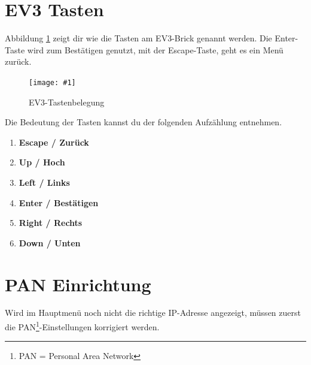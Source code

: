 \documentclass[
	12pt,
	colorbacktitle,
	accentcolor=tud1c,
	german,
	article
]{tuddesign/tudreport}
\newcommand{\gcenter}[4]{
	\begin{figure}[h]
	\centering 
	\texttt{[image: \#1]}
	\caption{#2}
	\label{fig:#3}
	\end{figure}
}
\begin{document}
		\newpage
		\section{EV3 Tasten}
		Abbildung \ref{fig:buttons} zeigt dir wie die Tasten am EV3-Brick genannt werden. Die Enter-Taste wird zum Bestätigen genutzt, mit der Escape-Taste, geht es ein Menü zurück. 
		\gcenter{img/ev3_buttons.png}{EV3-Tastenbelegung\protect\footnotemark\ }{buttons}{.5\textwidth}
		
		Die Bedeutung der Tasten kannst du der folgenden Aufzählung entnehmen. 
		\begin{enumerate}
			\item \textbf{Escape / Zurück}
			\item \textbf{Up / Hoch}
			\item \textbf{Left / Links}
			\item \textbf{Enter / Bestätigen}
			\item \textbf{Right / Rechts}  
			\item \textbf{Down / Unten}  
		\end{enumerate}
	
		\section{PAN Einrichtung}
		\label{sec:pan}
		Wird im Hauptmenü noch nicht die richtige IP-Adresse angezeigt, müssen zuerst die PAN\footnote{PAN = Personal Area Network}-Einstellungen korrigiert werden.
		
\end{document}
